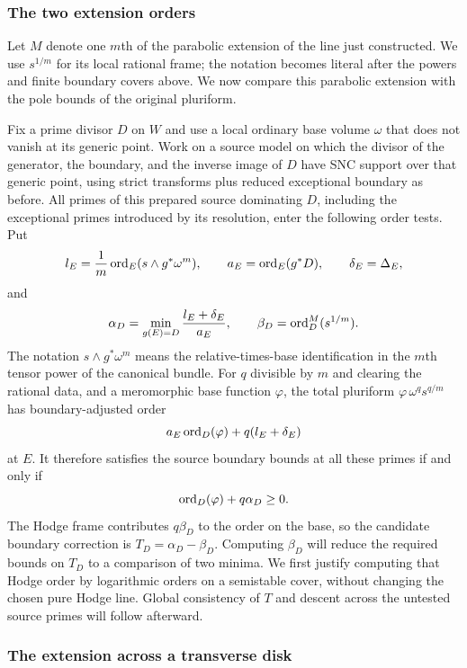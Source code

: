 \subsubsection{The two extension orders}

Let $M$ denote one $m$th of the parabolic extension of the line just
constructed.  We use $s^{1/m}$ for its local rational frame; the
notation becomes literal after the powers and finite boundary covers
above. We now compare this parabolic extension with the pole bounds
of the original pluriform.

Fix a prime divisor $D$ on $W$ and use a local ordinary base volume
$\omega$ that does not vanish at its generic point. Work on a source
model on which the divisor of the generator, the boundary, and the
inverse image of $D$ have SNC support over that generic point,
using strict transforms plus reduced exceptional boundary as before.
All primes of this prepared source dominating $D$, including the
exceptional primes introduced by its resolution, enter the following
order tests. Put
\[
 l_E=\frac1m\operatorname{ord}_E(s\wedge g^*\omega^m),\qquad
 a_E=\operatorname{ord}_E(g^*D),\qquad \delta_E=\Delta_E,
\]
and
\[
 \alpha_D=\min_{g(E)=D}\frac{l_E+\delta_E}{a_E},
 \qquad \beta_D=\operatorname{ord}_D^M(s^{1/m}).
\]
The notation $s\wedge g^*\omega^m$ means the relative-times-base
identification in the $m$th tensor power of the canonical bundle.
For $q$ divisible by $m$ and clearing the rational data, and a
meromorphic base function $\varphi$, the total pluriform
$\varphi\,\omega^q s^{q/m}$ has boundary-adjusted order
\[
 a_E\operatorname{ord}_D(\varphi)+q(l_E+\delta_E)
\]
at $E$. It therefore satisfies the source boundary bounds at all
these primes if and only if
\begin{equation}\label{rankone:base-bound}
 \operatorname{ord}_D(\varphi)+q\alpha_D\geq0.
\end{equation}
The Hodge frame contributes $q\beta_D$ to the order on the base,
so the candidate boundary correction is $T_D=\alpha_D-\beta_D$.
Computing $\beta_D$ will reduce the required bounds on $T_D$ to
a comparison of two minima. We first justify computing that Hodge
order by logarithmic orders on a semistable cover, without changing
the chosen pure Hodge line. Global consistency of $T$ and descent
across the untested source primes will follow afterward.

\subsubsection{The extension across a transverse disk}

